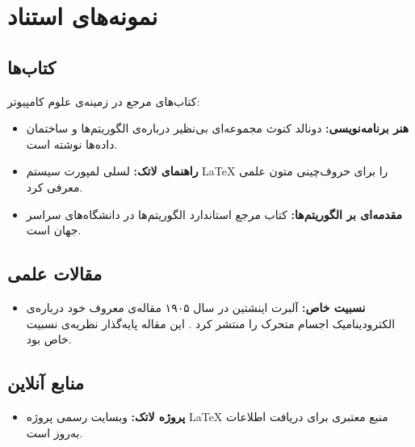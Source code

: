 \documentclass{matinbook}
\begin{document}
\chapter{نمونه‌های استناد}
\label{chap:citation-examples}

\section{کتاب‌ها}
\label{sec:citation-books}

کتاب‌های مرجع در زمینه‌ی علوم کامپیوتر:

\begin{itemize}
    \item \textbf{هنر برنامه‌نویسی:} دونالد کنوث
    \cite{knuth1984} مجموعه‌ای بی‌نظیر درباره‌ی
    الگوریتم‌ها و ساختمان داده‌ها نوشته است.

    \item \textbf{راهنمای لاتک:} لسلی لمپورت
    \cite{lamport1994} سیستم \LaTeX{} را برای
    حروف‌چینی متون علمی معرفی کرد.

    \item \textbf{مقدمه‌ای بر الگوریتم‌ها:} کتاب
     \cite{cormen2009} مرجع استاندارد
    الگوریتم‌ها در دانشگاه‌های سراسر جهان است.
\end{itemize}

\section{مقالات علمی}
\label{sec:citation-articles}

\begin{itemize}
    \item \textbf{نسبیت خاص:} آلبرت اینشتین در سال
    ۱۹۰۵ مقاله‌ی معروف خود درباره‌ی الکترودینامیک
    اجسام متحرک را منتشر کرد \cite{einstein1905}.
    این مقاله پایه‌گذار نظریه‌ی نسبیت خاص بود.
\end{itemize}

\section{منابع آنلاین}
\label{sec:citation-online}

\begin{itemize}
    \item \textbf{پروژه لاتک:} وبسایت رسمی پروژه
    \LaTeX{} \cite{latex-project} منبع معتبری برای
    دریافت اطلاعات به‌روز است.
\end{itemize}
\end{document}
